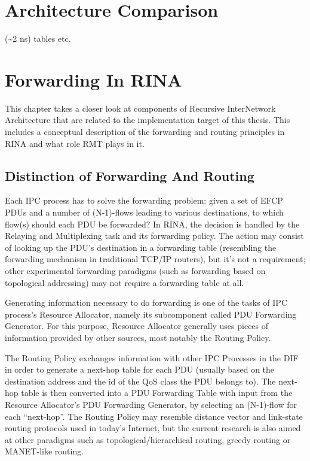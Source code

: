 \chapter{Architecture Comparison}
    (\textasciitilde2 ns)
    tables etc.

\chapter{Forwarding In RINA}

    This chapter takes a closer look at components of Recursive InterNetwork Architecture that are related to the implementation target of this thesis. This includes a conceptual description of the forwarding and routing principles in RINA and what role RMT plays in it.


    \section{Distinction of Forwarding And Routing}
        Each IPC process has to solve the forwarding problem: given a set of EFCP PDUs and a number of (N-1)-flows leading to various destinations, to which flow(s) should each PDU be forwarded? In RINA, the decision is handled by the Relaying and Multiplexing task and its forwarding policy. The action may consist of looking up the PDU's destination in a forwarding table (resembling the forwarding mechanism in traditional TCP/IP routers), but it's not a requirement; other experimental forwarding paradigms (such as forwarding based on topological addressing) may not require a forwarding table at all.

        Generating information necessary to do forwarding is one of the tasks of IPC process's Resource Allocator, namely its subcomponent called PDU Forwarding Generator. For this purpose, Resource Allocator generally uses pieces of information provided by other sources, most notably the Routing Policy.

        The Routing Policy exchanges information with other IPC Processes in the DIF in order to generate a next-hop table for each PDU (usually based on the destination address and the id of the QoS class the PDU belongs to). The next-hop table is then converted into a PDU Forwarding Table with input from the Resource Allocator's PDU Forwarding Generator, by selecting an (N-1)-flow for each ``next-hop''. The Routing Policy may resemble distance vector and link-state routing protocols used in today's Internet, but the current research is also aimed at other paradigms such as topological/hierarchical routing, greedy routing or MANET-like routing.


